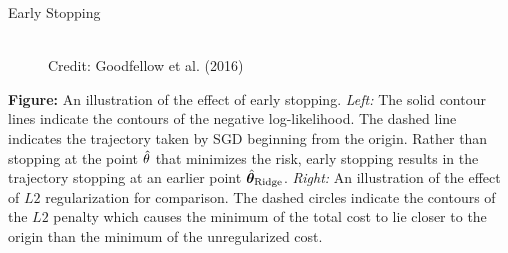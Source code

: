 \documentclass[11pt,compress,t,notes=noshow, xcolor=table]{beamer}
\begin{document}
\begin{vbframe}{Early Stopping}
\begin{figure}
      \tiny{\\ Credit: Goodfellow et al. (2016)\\}
  \end{figure}
  
\footnotesize 
\textbf{Figure:} An illustration of the effect of early stopping. \textit{Left:} The solid contour lines indicate the contours of the negative log-likelihood. The dashed line indicates the trajectory taken by SGD beginning from the origin. Rather than stopping at the point $\hat{\theta}$ that minimizes the risk, early stopping results in the trajectory stopping at an earlier point $\hat{\bm{\theta}}_{\text{Ridge}}$. \textit{Right:} An illustration of the effect of $L2$ regularization for comparison. The dashed circles indicate the contours of the $L2$ penalty which causes the minimum of the total cost to lie closer to the origin than the minimum of the unregularized cost.
\end{vbframe}



\endlecture
\end{document}
